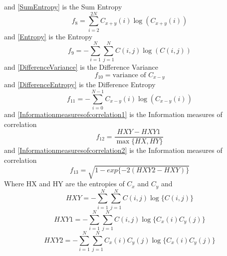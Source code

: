 and \ref{SumEntropy} is the Sum Entropy
\begin{equation}\label{SumEntropy}
  f_8 = \sum_{i=2}^{2N}C_{x+y}(i) \log(C_{x+y}(i))
\end{equation}
and \ref{Entropy} is the Entropy
\begin{equation}\label{Entropy}
  f_9 = -\sum_{i=1}^{N}\sum_{j=1}^{N} C(i,j) \log(C(i,j))
\end{equation}
and \ref{DifferenceVariance} is the Difference Variance
\begin{equation}\label{DifferenceVariance}
  f_{10} = \text{variance of }C_{x-y}
\end{equation}
and \ref{DifferenceEntropy} is the Difference Entropy
\begin{equation}\label{DifferenceEntropy}
  f_{11} = -\sum_{i=0}^{N-1} C_{x-y}(i) \log(C_{x-y}(i))
\end{equation}
and \ref{Informationmeasuresofcorrelation1} is the Information measures of correlation
\begin{equation}\label{Informationmeasuresofcorrelation1}
  f_{12} = \frac{HXY-HXY1}{\max\{HX,HY\}}
\end{equation}
and \ref{Informationmeasuresofcorrelation2} is the Information measures of correlation
\begin{equation}\label{Informationmeasuresofcorrelation2}
  f_{13} = \sqrt{1-exp\{-2(HXY2-HXY)\}}
\end{equation}
Where HX and HY are the entropies of $C_x$ and $C_y$ and
\begin{equation}\label{HXY}
  HXY = -\sum_{i=1}^{N}\sum_{j=1}^{N}C(i,j)\log\{C(i,j)\}
\end{equation}
\begin{equation}\label{HXY1}
  HXY1 = -\sum_{i=1}^{N}\sum_{j=1}^{N}C(i,j)\log\{C_x(i)C_y(j)\}
\end{equation}
\begin{equation}\label{HXY2}
  HXY2 = -\sum_{i=1}^{N}\sum_{j=1}^{N}C_x(i)C_y(j)\log\{C_x(i)C_y(j)\}
\end{equation}